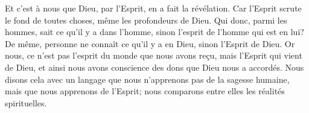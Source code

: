 Et c’est à nous que Dieu, par l’Esprit, en a fait la révélation.
Car l’Esprit scrute le fond de toutes choses,
	même les profondeurs de Dieu.
Qui donc, parmi les hommes, sait ce qu’il y a dans l’homme,
	sinon l’esprit de l’homme qui est en lui?
De même, personne ne connaît ce qu’il y a en Dieu, sinon l’Esprit de Dieu.
Or nous, ce n’est pas l’esprit du monde que nous avons reçu,
	mais l’Esprit qui vient de Dieu,
	et ainsi nous avons conscience des dons que Dieu nous a accordés.
Nous disons cela avec un langage que nous n’apprenons pas de la sagesse humaine,
	mais que nous apprenons de l’Esprit;
	nous comparons entre elles les réalités spirituelles.

